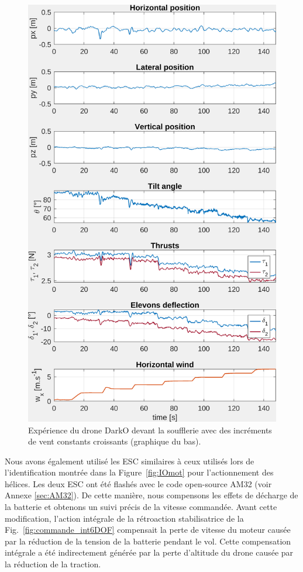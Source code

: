 \begin{figure}[ht!]
    \centering
    \includegraphics[trim=0cm 0cm 0cm 0cm,clip,width=0.6\columnwidth]{figures/exp_systune_struct.png}
    \caption{Expérience du drone DarkO devant la soufflerie avec des incréments de vent constants croissants (graphique du bas).}
    \label{fig:ExpSytuneStruct}
\end{figure}


Nous avons également utilisé les ESC similaires à ceux utilisés lors de l'identification montrée dans la Figure~\ref{fig:IOmot} pour l'actionnement des hélices. Les deux ESC ont été flashés avec le code open-source AM32 (voir Annexe \ref{sec:AM32}). De cette manière, nous compensons les effets de décharge de la batterie et obtenons un suivi précis de la vitesse commandée. Avant cette modification, l'action intégrale de la rétroaction stabilisatrice de la Fig.~\ref{fig:commande_int6DOF} compensait la perte de vitesse du moteur causée par la réduction de la tension de la batterie pendant le vol. Cette compensation intégrale a été indirectement générée par la perte d'altitude du drone causée par la réduction de la traction. 

